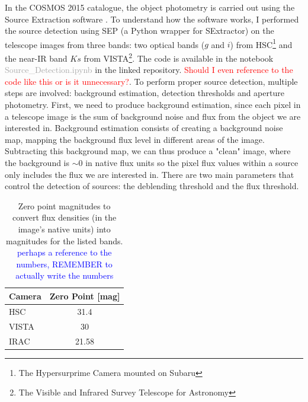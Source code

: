 In the COSMOS 2015 catalogue, the object photometry is carried out using the Source Extraction software  \cite[SExtractor,][]{SExtractor_1996}. To understand how the software works, I performed the source detection using SEP \cite{SEP_2018} (a Python wrapper for SExtractor) on the telescope images from three bands: two optical bands ($g$ and $i$) from HSC\footnote{The Hypersurprime Camera mounted on Subaru} and the near-IR band $Ks$ from VISTA\footnote{The Visible and Infrared Survey Telescope for Astronomy}. The code is available in the notebook \textcolor{darkgray}{Source\_Detection.ipynb} in the linked repository. \textcolor{red}{Should I even reference to the code like this or is it unnecessary?}. To perform proper source detection, multiple steps are involved: background estimation, detection thresholds and aperture photometry. First, we need to produce background estimation, since each pixel in a telescope image is the sum of background noise and flux from the object we are interested in. Background estimation consists of creating a background noise map, mapping the background flux level in different areas of the image. Subtracting this background map, we can thus produce a "clean" image, where the background is $\sim 0$ in native flux units so the pixel flux values within a source only includes the flux we are interested in. There are two main parameters that control the detection of sources: the deblending threshold and the flux threshold. 
\begin{table}
    \begin{tabular}{lc}
    \hline
    \textbf{Camera} & \textbf{Zero Point [mag]} \\ \hline
    HSC &  31.4 \\ \hline
    VISTA &  30 \\ \hline
    IRAC &  21.58 \\ \hline
    \end{tabular}
    \caption{Zero point magnitudes to convert flux  densities (in the image's native units) into magnitudes for the listed bands. \textcolor{blue}{perhaps a reference to the numbers, REMEMBER to actually write the numbers}}
    \label{zero_point}
\end{table}
